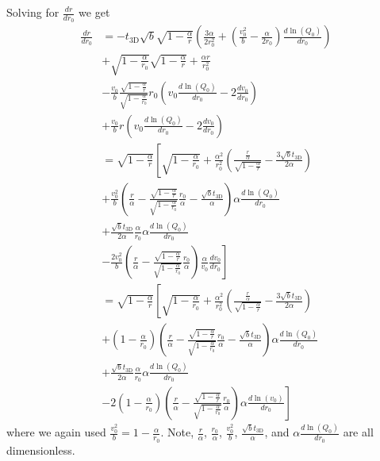 \documentclass[aps,prl,twocolumn,showpacs,superscriptaddress,groupedaddress]{revtex4-1}  %
\begin{document}
Solving for $\frac{d r}{d r_0}$ we get
\begin{align}
  \frac{d r}{d r_0} &= - t_\text{3D} \sqrt{b} \sqrt{1 - \frac{\alpha}{r}} \left( \frac{3\alpha}{2 r_0^2}  + \left( \frac{v_0^2}{b} - \frac{\alpha}{2 r_0} \right) \frac{d \ln(Q_0)}{d r_0}\right) \nonumber\\
                           & + \sqrt{1 - \frac{\alpha}{r_0}}\sqrt{1 - \frac{\alpha}{r}} + \frac{\alpha r}{r_0^2} \nonumber\\
                           & - \frac{v_0}{b}\frac{\sqrt{1 - \frac{\alpha}{r}}}{\sqrt{1 - \frac{\alpha}{r_0}}}r_0 \left( v_0 \frac{d \ln(Q_0)}{d r_0} - 2 \frac{d v_0}{d r_0}\right) \nonumber\\
                           & + \frac{v_0}{b} r \left( v_0 \frac{d \ln(Q_0)}{d r_0} - 2 \frac{d v_0}{d r_0}\right)\nonumber\\
                           &= \sqrt{1 - \frac{\alpha}{r}}\left [\sqrt{1 - \frac{\alpha}{r_0}} + \frac{\alpha^2}{r_0^2} \left(\frac{\frac{r}{\alpha}}{\sqrt{1 - \frac{\alpha}{r}}}  -  \frac{3\sqrt{b} t_\text{3D}}{2 \alpha}\right)\right.\nonumber\\
                           &+ \frac{v_0^2}{b}\left( \frac{r}{\alpha} - \frac{\sqrt{1 - \frac{\alpha}{r}}}{\sqrt{1 - \frac{\alpha}{r_0}}}\frac{r_0}{\alpha} - \frac{\sqrt{b} t_\text{3D}}{\alpha} \right)\alpha \frac{d \ln(Q_0)}{d r_0}\nonumber\\
                           &\left.+\frac{\sqrt{b} t_\text{3D}}{2 \alpha} \frac{\alpha}{r_0} \alpha \frac{d \ln(Q_0)}{d r_0}\right.\nonumber\\
                           &\left.- \frac{2 v_0^2}{b} \left( \frac{r}{\alpha} - \frac{\sqrt{1 - \frac{\alpha}{r}}}{\sqrt{1 - \frac{\alpha}{r_0}}}\frac{r_0}{\alpha} \right) \frac{\alpha}{v_0} \frac{d v_0}{d r_0}\right]\nonumber\\
                           &= \sqrt{1 - \frac{\alpha}{r}}\left [\sqrt{1 - \frac{\alpha}{r_0}} + \frac{\alpha^2}{r_0^2} \left(\frac{\frac{r}{\alpha}}{\sqrt{1 - \frac{\alpha}{r}}}  -  \frac{3\sqrt{b} t_\text{3D}}{2 \alpha}\right)\right.\nonumber\\
                           &+ \left(1 - \frac{\alpha}{r_0}\right) \left( \frac{r}{\alpha} - \frac{\sqrt{1 - \frac{\alpha}{r}}}{\sqrt{1 - \frac{\alpha}{r_0}}}\frac{r_0}{\alpha}- \frac{\sqrt{b} t_\text{3D}}{\alpha} \right)\alpha \frac{d \ln(Q_0)}{d r_0}\nonumber\\
                           &+\frac{\sqrt{b} t_\text{3D}}{2 \alpha} \frac{\alpha}{r_0} \alpha \frac{d \ln(Q_0)}{d r_0}\nonumber\\
                           &\left.- 2 \left(1 - \frac{\alpha}{r_0}\right) \left( \frac{r}{\alpha} - \frac{\sqrt{1 - \frac{\alpha}{r}}}{\sqrt{1 - \frac{\alpha}{r_0}}}\frac{r_0}{\alpha} \right) \alpha \frac{d \ln(v_0)}{d r_0} \right]\label{eq:3d dr over dr_0}
\end{align}
where we again used $\frac{v_0^2}{b} = 1 - \frac{\alpha}{r_0}$.  Note, $\frac{r}{\alpha}$, $\frac{r_0}{\alpha}$, $\frac{v_0^2}{b}$, 
$\frac{\sqrt{b}t_\text{3D}}{\alpha}$, and $\alpha \frac{d \ln(Q_0)}{d r_0}$ are all dimensionless.
\end{document}
